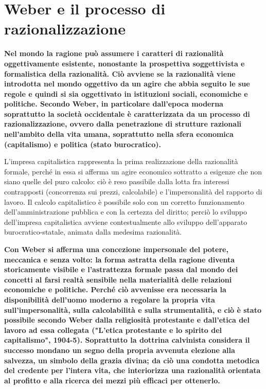 \section{Weber e il processo di razionalizzazione}

\textbf{Nel mondo la ragione può assumere i caratteri di razionalità oggettivamente esistente, nonostante la prospettiva soggettivista e formalistica della razionalità. Ciò avviene se la razionalità viene introdotta nel mondo oggettivo da un agire che abbia seguito le sue regole e quindi si sia oggettivato in istituzioni sociali, economiche e politiche. Secondo Weber, in particolare dall'epoca moderna soprattutto la società occidentale è caratterizzata da un processo di razionalizzazione, ovvero dalla penetrazione di strutture razionali  nell'ambito della vita umana, soprattutto  nella sfera economica (capitalismo) e politica (stato burocratico).}

L'impresa capitalistica rappresenta la prima realizzazione della razionalità formale, perché in essa si afferma un agire economico sottratto a esigenze che non siano quelle del puro calcolo: ciò è reso passibile dalla lotta fra interessi contrapposti (concorrenza sui prezzi, calcolabile) e l'impersonalità del rapporto di lavoro.
Il calcolo capitalistico è possibile solo con un corretto funzionamento dell'amministrazione pubblica e con la certezza del diritto; perciò lo sviluppo dell'impresa capitalistica avviene contestualmente allo sviluppo dell'apparato burocratico-statale, animata dalla medesima razionalità.

\textbf{Con Weber si afferma una concezione impersonale del potere, meccanica e senza volto: la forma astratta della ragione diventa storicamente visibile e l'astrattezza formale passa dal mondo dei concetti al farsi realtà sensibile nella materialità delle relazioni economiche e politiche. Perché ciò avvenisse era necessaria la disponibilità dell'uomo moderno a regolare la propria vita sull'impersonalità, sulla calcolabilità e sulla strumentalità, e ciò è stato possibile secondo Weber dalla religiosità protestante e dall'etica del lavoro ad essa collegata ("L'etica protestante e lo spirito del capitalismo", 1904-5). Soprattutto  la dottrina calvinista considera il successo mondano  un segno della propria avvenuta elezione alla salvezza, un simbolo della grazia divina; da ciò una condotta metodica del credente per l'intera vita, che interiorizza una razionalità orientata al profitto e alla ricerca dei mezzi più efficaci per ottenerlo.}

